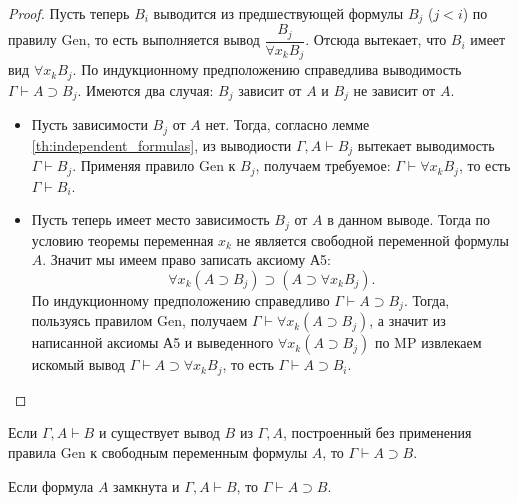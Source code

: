 \begin{proof}
    Пусть теперь $B_i$ выводится из предшествующей формулы $B_j$ ($j < i$) по правилу Gen, то есть выполняется вывод $\dfrac{B_j}{\forall x_kB_j}$. Отсюда вытекает, что $B_i$ имеет вид $\forall x_kB_j$. По индукционному предположению справедлива выводимость $\Gamma \vdash A \supset B_j$. Имеются два случая: $B_j$ зависит от $A$ и $B_j$ не зависит от $A$. 
    \begin{itemize}
        \item Пусть зависимости $B_j$ от $A$ нет. Тогда, согласно лемме \ref{th:independent_formulas}, из выводиости $\Gamma, A \vdash B_j$ вытекает выводимость $\Gamma \vdash B_j$. Применяя правило Gen к $B_j$, получаем требуемое: $\Gamma \vdash \forall x_kB_j$, то есть $\Gamma \vdash B_i$.
        \item Пусть теперь имеет место зависимость $B_j$ от $A$ в данном выводе. Тогда по условию теоремы переменная $x_k$ не является свободной переменной формулы $A$. Значит мы имеем право записать аксиому А5: 
        \[
            \forall x_k(A \supset B_j) \supset (A \supset \forall x_kB_j).
        \]
        По индукционному предположению справедливо $\Gamma \vdash A \supset B_j$. Тогда, пользуясь правилом Gen, получаем $\Gamma \vdash \forall x_k(A \supset B_j)$, а значит из написанной аксиомы А5 и выведенного $\forall x_k(A \supset B_j)$ по MP извлекаем искомый вывод $\Gamma \vdash A \supset \forall x_kB_j$, то есть $\Gamma \vdash A \supset B_i$.
    \end{itemize}
     
\end{proof}

\begin{corollary}
    Если $\Gamma, A \vdash B$ и существует вывод $B$ из $\Gamma, A$, построенный без применения правила Gen к свободным переменным формулы $A$, то $\Gamma \vdash A \supset B$.
\end{corollary}

\begin{corollary}
    Если формула $A$ замкнута и $\Gamma, A \vdash B$, то $\Gamma \vdash A \supset B$.
\end{corollary}

